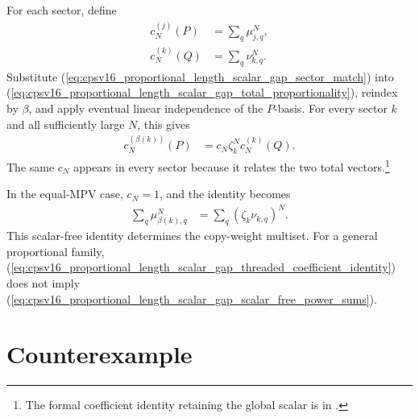 \documentclass{article}
\begin{document}
For each sector, define
\begin{align}
    c_N^{(j)}(P)
        &=\sum_q\mu_{j,q}^N,
    \label{eq:cpsv16_proportional_length_scalar_gap_p_coefficient}\\
    c_N^{(k)}(Q)
        &=\sum_q\nu_{k,q}^N.
    \label{eq:cpsv16_proportional_length_scalar_gap_q_coefficient}
\end{align}
Substitute
(\ref{eq:cpsv16_proportional_length_scalar_gap_sector_match}) into
(\ref{eq:cpsv16_proportional_length_scalar_gap_total_proportionality}),
reindex by $\beta$, and apply eventual linear independence of the $P$-basis.
For every sector $k$ and all sufficiently large $N$, this gives
\begin{align}
    c_N^{(\beta(k))}(P)
        &=c_N\zeta_k^Nc_N^{(k)}(Q).
    \label{eq:cpsv16_proportional_length_scalar_gap_threaded_coefficient_identity}
\end{align}
The same $c_N$ appears in every sector because it relates the two total
vectors.\footnote{The formal coefficient identity retaining the global scalar
is
 in
.}

In the equal-MPV case, $c_N=1$, and the identity becomes
\begin{align}
    \sum_q\mu_{\beta(k),q}^N
        &=\sum_q(\zeta_k\nu_{k,q})^N.
    \label{eq:cpsv16_proportional_length_scalar_gap_scalar_free_power_sums}
\end{align}
This scalar-free identity determines the copy-weight multiset. For a general
proportional family,
(\ref{eq:cpsv16_proportional_length_scalar_gap_threaded_coefficient_identity})
does not imply
(\ref{eq:cpsv16_proportional_length_scalar_gap_scalar_free_power_sums}).

\section{Counterexample}
\end{document}
